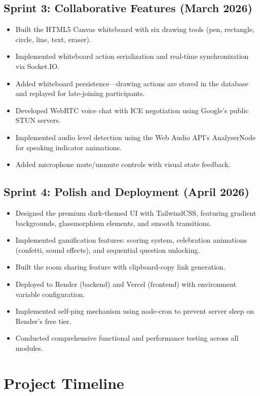\subsection{Sprint 3: Collaborative Features (March 2026)}
\begin{itemize}
    \item Built the HTML5 Canvas whiteboard with six drawing tools (pen, rectangle, circle, line, text, eraser).
    \item Implemented whiteboard action serialization and real-time synchronization via Socket.IO.
    \item Added whiteboard persistence---drawing actions are stored in the database and replayed for late-joining participants.
    \item Developed WebRTC voice chat with ICE negotiation using Google's public STUN servers.
    \item Implemented audio level detection using the Web Audio API's AnalyserNode for speaking indicator animations.
    \item Added microphone mute/unmute controls with visual state feedback.
\end{itemize}

\subsection{Sprint 4: Polish and Deployment (April 2026)}
\begin{itemize}
    \item Designed the premium dark-themed UI with TailwindCSS, featuring gradient backgrounds, glassmorphism elements, and smooth transitions.
    \item Implemented gamification features: scoring system, celebration animations (confetti, sound effects), and sequential question unlocking.
    \item Built the room sharing feature with clipboard-copy link generation.
    \item Deployed to Render (backend) and Vercel (frontend) with environment variable configuration.
    \item Implemented self-ping mechanism using node-cron to prevent server sleep on Render's free tier.
    \item Conducted comprehensive functional and performance testing across all modules.
\end{itemize}

\section{Project Timeline}

